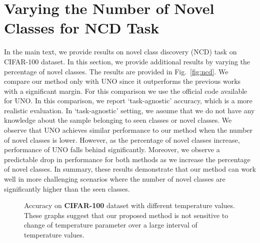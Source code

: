 \documentclass[runningheads]{eccv2022submission}
\begin{document}
\section{Varying the Number of Novel Classes for NCD Task}
\label{sec:novel}
In the main text, we provide results on novel class discovery (NCD) task on CIFAR-100 dataset. In this section, we provide additional results by varying the percentage of novel classes. The results are provided in Fig.~\ref{fig:ncd}. We compare our method only with UNO since it outperforms the previous works with a significant margin. For this comparison we use the official code available for UNO. In this comparison, we report `task-agnostic' accuracy, which is a more realistic evaluation. In `task-agnostic' setting, we assume that we do not have any knowledge about the sample belonging to seen classes or novel classes. We observe that UNO achieves similar performance to our method when the number of novel classes is lower. However, as the percentage of novel classes increase, performance of UNO falls behind significantly. Moreover, we observe a predictable drop in performance for both methods as we increase the percentage of novel classes. In summary, these results demonstrate that our method can work well in more challenging scenarios where the number of novel classes are significantly higher than the seen classes.     





\begin{figure*}
\captionsetup[subfloat]{labelformat=empty}
\centering
\vspace{-4mm}
    \caption{Accuracy on \textbf{CIFAR-100} dataset with different temperature values. These graphs suggest that our proposed method is not sensitive to change of temperature parameter over a large interval of temperature values.}
    \label{fig:temperature}
\end{figure*}
\end{document}
